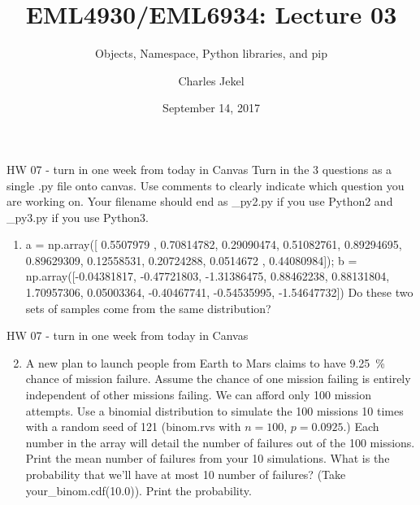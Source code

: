 \documentclass[10pt]{beamer}
\title{EML4930/EML6934: Lecture 03}
\subtitle{Objects, Namespace, Python libraries, and pip}
\date{September 14, 2017}
\author{Charles Jekel}
\begin{document}
\begin{frame}[fragile]{HW 07 - turn in one week from today in Canvas}
Turn in the 3 questions as a single .py file onto canvas. Use comments to clearly indicate which question you are working on. Your filename should end as \_py2.py if you use Python2 and \_py3.py if you use Python3.
\begin{enumerate}
\item a =  np.array([ 0.5507979 ,  0.70814782,  0.29090474,  0.51082761,  0.89294695,
        0.89629309,  0.12558531,  0.20724288,  0.0514672 ,  0.44080984]);
      b = np.array([-0.04381817, -0.47721803, -1.31386475,  0.88462238,  0.88131804,
        1.70957306,  0.05003364, -0.40467741, -0.54535995, -1.54647732])
      Do these two sets of samples come from the same distribution? 

\end{enumerate}
\end{frame}

\begin{frame}[fragile]{HW 07 - turn in one week from today in Canvas}
\begin{enumerate}
\setcounter{enumi}{1}
\item A new plan to launch people from Earth to Mars claims to have 9.25~\% chance of mission failure. Assume the chance of one mission failing is entirely independent of other missions failing. We can afford only 100 mission attempts. Use a binomial distribution to simulate the 100 missions 10 times with a random seed of 121 (binom.rvs with $n=100$, $p = 0.0925$.) Each number in the array will detail the number of failures out of the 100 missions. Print the mean number of failures from your 10 simulations. What is the probability that we'll have at most 10 number of failures? (Take your\_binom.cdf(10.0)). Print the probability.
\end{enumerate}
\end{frame}
\end{document}
